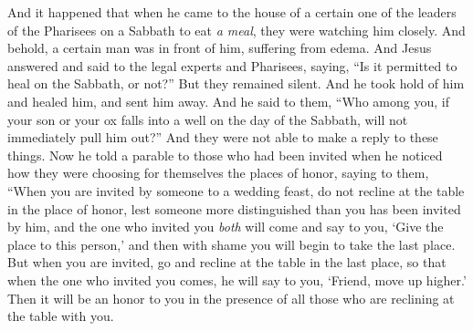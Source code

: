 \begin{biblechapter} %
 And it happened that when he came to the house of a certain one of the leaders of the Pharisees on a Sabbath to eat \textit{a meal}, they were watching him closely.
\verse And behold, a certain man was in front of him, suffering from edema.
\verse And Jesus answered and said to the legal experts and Pharisees, saying, “Is it permitted to heal on the Sabbath, or not?”
\verse But they remained silent. And he took hold of him and healed him, and sent him away.
\verse And he said to them, “Who among you, if your son or your ox falls into a well on the day of the Sabbath, will not immediately pull him out?”
\verse And they were not able to make a reply to these things.
 Now he told a parable to those who had been invited when he noticed how they were choosing for themselves the places of honor, saying to them,
\verse “When you are invited by someone to a wedding feast, do not recline at the table in the place of honor, lest someone more distinguished than you has been invited by him,
\verse and the one who invited you \textit{both} will come and say to you, ‘Give the place to this person,’ and then with shame you will begin to take the last place.
\verse But when you are invited, go and recline at the table in the last place, so that when the one who invited you comes, he will say to you, ‘Friend, move up higher.’ Then it will be an honor to you in the presence of all those who are reclining at the table with you.

\end{biblechapter}

